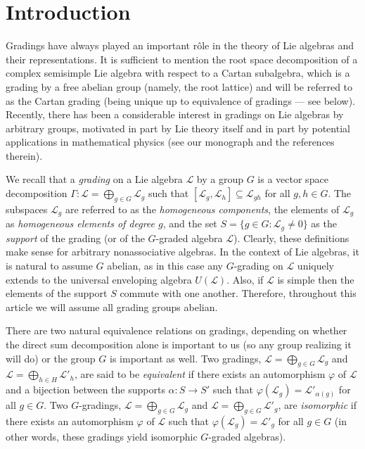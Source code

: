 \documentclass[a4paper,reqno]{amsart}
\theoremstyle{definition}
\numberwithin{theorem}{section}
\numberwithin{equation}{section}
\begin{document}
\section{Introduction}\label{se:intro}

Gradings have always played an important r\^{o}le in the theory of Lie algebras and their representations. It is sufficient to mention the root space decomposition of a complex semisimple Lie algebra with respect to a Cartan subalgebra, which is a grading by a free abelian group (namely, the root lattice) and will be referred to as the Cartan grading (being unique up to equivalence of gradings --- see below). Recently, there has been a considerable interest in gradings on Lie algebras by arbitrary groups, motivated in part by Lie theory itself and in part by potential applications in mathematical physics (see our monograph \cite{EK_mon} and the references therein).

We recall that a \emph{grading} on a Lie algebra ${\mathcal{L}}$ by a group $G$ is a vector space decomposition $\Gamma:{\mathcal{L}}=\bigoplus_{g\in G}{\mathcal{L}}_g$ such that $[{\mathcal{L}}_g,{\mathcal{L}}_h]\subseteq{\mathcal{L}}_{gh}$ for all $g,h\in G$. The subspaces ${\mathcal{L}}_g$ are referred to as the \emph{homogeneous components}, the elements of ${\mathcal{L}}_g$ as \emph{homogeneous elements of degree $g$}, and the set $S=\{g\in G:{\mathcal{L}}_g\ne 0\}$ as the \emph{support} of the grading (or of the $G$-graded algebra ${\mathcal{L}}$). Clearly, these definitions make sense for arbitrary nonassociative algebras. In the context of Lie algebras, it is natural to assume $G$ abelian, as in this case any $G$-grading on ${\mathcal{L}}$ uniquely extends to the universal enveloping algebra $U({\mathcal{L}})$. Also, if ${\mathcal{L}}$ is simple then the elements of the support $S$ commute with one another. Therefore, throughout this article we will assume all grading groups abelian.

There are two natural equivalence relations on gradings, depending on whether the direct sum decomposition alone is important to us (so any group realizing it will do) or the group $G$ is important as well. Two gradings, ${\mathcal{L}}=\bigoplus_{g\in G}{\mathcal{L}}_g$ and ${\mathcal{L}}=\bigoplus_{h\in H}{\mathcal{L}}'_h$, are said to be \emph{equivalent} if there exists an automorphism ${\varphi}$ of ${\mathcal{L}}$ and a bijection between the supports $\alpha:S\to S'$ such that ${\varphi}({\mathcal{L}}_g)={\mathcal{L}}'_{\alpha(g)}$ for all $g\in G$. Two $G$-gradings, ${\mathcal{L}}=\bigoplus_{g\in G}{\mathcal{L}}_g$ and ${\mathcal{L}}=\bigoplus_{g\in G}{\mathcal{L}}'_g$, are \emph{isomorphic} if there exists an automorphism ${\varphi}$ of ${\mathcal{L}}$ such that ${\varphi}({\mathcal{L}}_g)={\mathcal{L}}'_g$ for all $g\in G$ (in other words, these gradings yield isomorphic $G$-graded algebras). 
\end{document}
